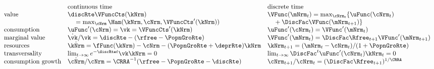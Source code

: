 \documentclass{econark}
\begin{document}
\begin{equation*}
\begin{array}{lll}
  & \text{continuous time} & \text{discrete time}
\\ \text{value} & \discRte\VFuncCts(\kNrm) & \VFunc(\mNrm_{t})=\max_{\cNrm_{t}}\{\uFunc(\cNrm_{t})
\\ & \quad {}=\max_{\cNrm}\Ham(\kNrm,\cNrm,\VFuncCts'(\kNrm)) & \quad {}+\DiscFac\VFunc(\mNrm_{t+1})\}
\\ \text{consumption} & \uFunc^{\prime}(\cNrm)=\vk=\VFuncCts'(\kNrm) & \uFunc^{\prime}(\cNrm_{t})=\VFunc^{\prime}(\mNrm_{t})
\\ \text{marginal value} & \dot{\vk}/\vk=\discRte-(\rfree-\PopnGroRte) & \VFunc^{\prime}(\mNrm_{t})=\DiscFac\Rfree_{t+1}\VFunc^{\prime}(\mNrm_{t+1})
\\ \text{resources} & \dot{\kNrm}=\fFunc(\kNrm)-\cNrm-(\PopnGroRte+\deprRte)\kNrm & \kNrm_{t+1}=(\mNrm_{t}-\cNrm_{t})/(1+\PopnGroRte)
\\ \text{transversality} & \lim_{t\rightarrow\infty}e^{-\discRte t}\vk\kNrm=0 & \lim_{t\rightarrow\infty}\DiscFac^{t}\uFunc^{\prime}(\cNrm_{t})\kNrm_{t}=0
\\ \text{consumption growth} & \dot{\cNrm}/\cNrm=\CRRA^{-1}(\rfree-\PopnGroRte-\discRte) & \cNrm_{t+1}/\cNrm_{t}=(\DiscFac\Rfree_{t+1})^{1/\CRRA}
\end{array}
\end{equation*}



\end{document}
